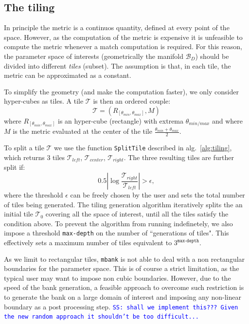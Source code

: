 \documentclass[twocolumn,showpacs,preprintnumbers,nofootinbib,prd,
superscriptaddress,10pt]{revtex4-1}
\newcommand{\stefano}[1]{{\textcolor{blue}{\texttt{SS: #1}} }}
\begin{document}
\subsection{The tiling} \label{sec:tiling}

In principle the metric is a continuos quantity, defined at every point of the space. However, as the computation of the metric is expensive it is unfeasible to compute the metric whenever a match computation is required.
For this reason, the parameter space of interests (geometrically the manifold $\mathcal{B}_D$) should be divided into different {\it tiles} (subset). The assumption is that, in each tile, the metric can be approximated as a constant.

To simplify the geometry (and make the computation faster), we only consider hyper-cubes as tiles. A tile $\mathcal{T}$ is then an ordered couple:
\begin{equation} \label{eq:tile}
	\mathcal{T} = \left(R_{[\theta_{min}, \theta_{max}]}, M \right)
\end{equation}
where $R_{[\theta_{min}, \theta_{max}]}$ is an hyper-cube (rectangle) with extrema $\theta_{min/max}$ and where $M$ is the metric evaluated at the center of the tile $\frac{\theta_{min}+\theta_{max}}{2}$.

To split a tile $\mathcal{T}$ we use the function \texttt{SplitTile} described in alg.~\ref{alg:tiling}, which returns 3 tiles $\mathcal{T}_{left}$, $\mathcal{T}_{center}$, $\mathcal{T}_{right}$.
The three resulting tiles are further split if:
\begin{equation}
	0.5\left|\log\frac{\mathcal{T}_{right}}{\mathcal{T}_{left}}\right| > \epsilon,
\end{equation}
where the threshold $\epsilon$ can be freely chosen by the user and sets the total number of tiles being generated.
The tiling generation algorithm iteratively splits the an initial tile $\mathcal{T}_{0}$ covering all the space of interest, until all the tiles satisfy the condition above.
To prevent the algorithm from running indefinetely, we also impose a threshold \texttt{max-depth} on the number of ``generations of tiles". This effectively sets a maximum number of tiles equivalent to $3^{\texttt{max-depth}}$.

As we limit to rectangular tiles, \texttt{mbank} is not able to deal with a non rectangular boundaries for the parameter space. This is of course a strict limitation, as the typical user may want to impose non cubic boundaries. However, due to the speed of the bank generation, a feasible approach to overcome such restriction is to generate the bank on a large domain of interest and imposing any non-linear boundary as a post processing step. \stefano{shall we implement this??? Given the new random approach it shouldn't be too difficult...}
\end{document}

